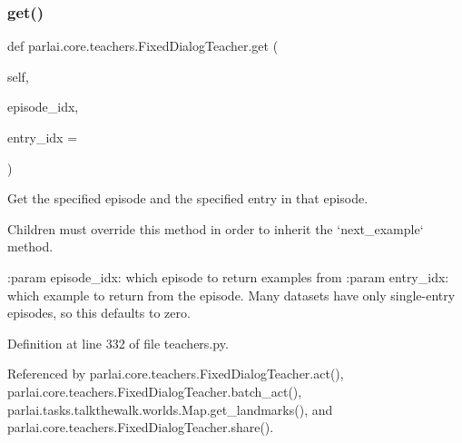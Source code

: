 \mbox{\label{classparlai_1_1core_1_1teachers_1_1FixedDialogTeacher_a7c4cbfbe5cf6e9dbdf8c00d140ef4e7e}} 
\subsubsection{\texorpdfstring{get()}{get()}}
{\footnotesize\ttfamily def parlai.\+core.\+teachers.\+Fixed\+Dialog\+Teacher.\+get (\begin{DoxyParamCaption}\item[{}]{self,  }\item[{}]{episode\+\_\+idx,  }\item[{}]{entry\+\_\+idx = {} }\end{DoxyParamCaption})}

\begin{DoxyVerb}Get the specified episode and the specified entry in that episode.

Children must override this method in order to inherit the
`next_example` method.

:param episode_idx:
    which episode to return examples from
:param entry_idx:
    which example to return from the episode.  Many datasets have only
    single-entry episodes, so this defaults to zero.
\end{DoxyVerb}
 

Definition at line 332 of file teachers.\+py.



Referenced by parlai.\+core.\+teachers.\+Fixed\+Dialog\+Teacher.\+act(), parlai.\+core.\+teachers.\+Fixed\+Dialog\+Teacher.\+batch\+\_\+act(), parlai.\+tasks.\+talkthewalk.\+worlds.\+Map.\+get\+\_\+landmarks(), and parlai.\+core.\+teachers.\+Fixed\+Dialog\+Teacher.\+share().

